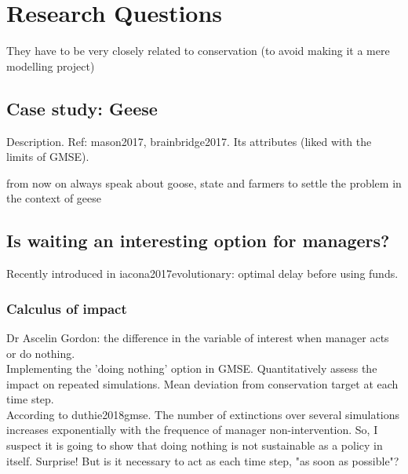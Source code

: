 \documentclass[12pt,a4paper]{article}
\begin{document}
\section{Research Questions}

They have to be very closely related to conservation (to avoid making it a mere modelling project)

\subsection{Case study: Geese}

Description. Ref: mason2017, brainbridge2017.
Its attributes (liked with the limits of GMSE). 

from now on always speak about goose, state and farmers to settle the problem in the context of geese

\subsection{Is waiting an interesting option for managers?}

Recently introduced in iacona2017evolutionary: optimal delay before using funds.

\subsubsection{Calculus of impact}
Dr Ascelin Gordon: the difference in the variable of interest when manager acts or do nothing.\\
Implementing the 'doing nothing' option in GMSE. Quantitatively assess the impact on repeated simulations. Mean deviation from conservation target at each time step.\\
According to duthie2018gmse. The number of extinctions over several simulations increases exponentially with the frequence of manager non-intervention. So, I suspect it is going to show that doing nothing is not sustainable as a policy in itself. Surprise!
But is it necessary to act as each time step, "as soon as possible"?
\end{document}
